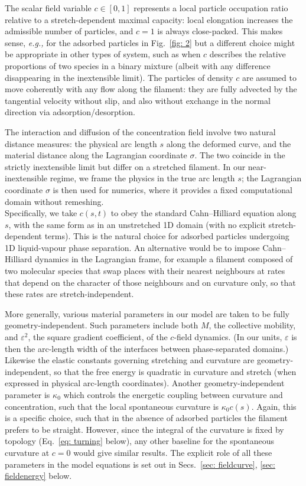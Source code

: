 \documentclass[
aip,
jcp,
reprint, 
floatfix
]{revtex4-1}
\begin{document}
The scalar field variable $c\in[0,1]$ represents a local particle occupation ratio relative to a stretch-dependent maximal capacity: local elongation increases the admissible number of particles, and $c=1$ is always close-packed. This makes sense, {\em e.g.,} for the adsorbed particles in Fig.~\ref{fig: 2} but a different choice might be appropriate in other types of system, such as when $c$ describes the relative proportions of two species in a binary mixture (albeit with any difference disappearing in the inextensible limit).
The particles of density $c$ are assumed to move coherently with any flow along the filament: they are fully
advected by the tangential velocity without slip, and also without exchange in the normal direction via adsorption/desorption. 

The interaction and diffusion of the concentration field involve two natural distance measures: the physical arc length $s$ along the deformed curve, and the material distance along the Lagrangian coordinate $\sigma$. The two coincide in the strictly inextensible limit but differ on a stretched filament. In our near-inextensible regime, we frame the physics in the true arc length $s$; the Lagrangian coordinate $\sigma$ is then used for numerics, where it provides a fixed computational domain without remeshing.\\
Specifically, we take $c(s, t)$ to obey the standard Cahn--Hilliard equation along $s$, with the same form as in an unstretched 1D domain (with no explicit stretch-dependent terms). This is the natural choice for adsorbed particles undergoing 1D liquid-vapour phase separation. An alternative would be to impose Cahn--Hilliard dynamics in the Lagrangian frame, for example a filament composed of two molecular species that swap places with their nearest neighbours at rates that depend on the character of those neighbours and on curvature only, so that these rates are stretch-independent.

More generally, various material parameters in our model are taken to be fully geometry-independent. Such parameters include both $M$, the collective mobility, and $\varepsilon^2$, the square gradient coefficient, of the $c$-field dynamics. (In our units, $\varepsilon$ is then the arc-length width of the interfaces between phase-separated domains.) Likewise the elastic constants governing stretching and curvature are geometry-independent, so that the free energy is quadratic in curvature and stretch (when expressed in physical arc-length coordinates). Another geometry-independent parameter is $\kappa_0$ which controls the energetic coupling between curvature and concentration, such that the local spontaneous curvature is $\kappa_0 c(s)$. Again, this is a specific choice, such that in the absence of adsorbed particles the filament prefers to be straight. However, since the integral of the curvature is fixed by topology (Eq.~\eqref{eq: turning} below), any other baseline for the spontaneous curvature at $c = 0$ would give similar results. The explicit role of all these parameters in the model equations is set out in Secs.~\ref{sec: fieldcurve}, \ref{sec: fieldenergy} below.
\end{document}
